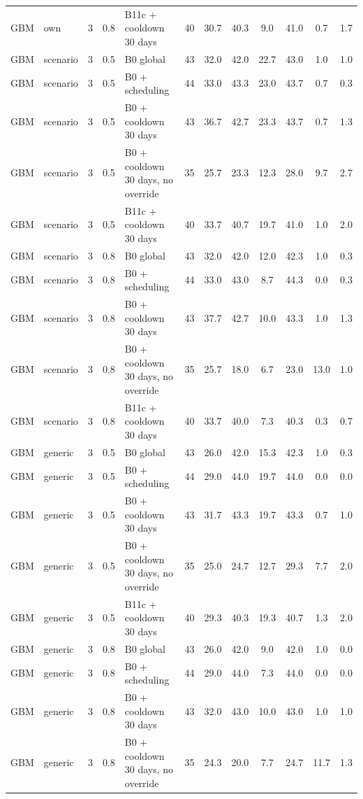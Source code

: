 \begin{longtable}{lllllccccccc}
GBM & own & 3 & 0.8 & B11c + cooldown 30 days & 40 & 30.7 & 40.3 & 9.0 & 41.0 & 0.7 & 1.7 \\
GBM & scenario & 3 & 0.5 & B0 global & 43 & 32.0 & 42.0 & 22.7 & 43.0 & 1.0 & 1.0 \\
GBM & scenario & 3 & 0.5 & B0 + scheduling & 44 & 33.0 & 43.3 & 23.0 & 43.7 & 0.7 & 0.3 \\
GBM & scenario & 3 & 0.5 & B0 + cooldown 30 days & 43 & 36.7 & 42.7 & 23.3 & 43.7 & 0.7 & 1.3 \\
GBM & scenario & 3 & 0.5 & B0 + cooldown 30 days, no override & 35 & 25.7 & 23.3 & 12.3 & 28.0 & 9.7 & 2.7 \\
GBM & scenario & 3 & 0.5 & B11c + cooldown 30 days & 40 & 33.7 & 40.7 & 19.7 & 41.0 & 1.0 & 2.0 \\
GBM & scenario & 3 & 0.8 & B0 global & 43 & 32.0 & 42.0 & 12.0 & 42.3 & 1.0 & 0.3 \\
GBM & scenario & 3 & 0.8 & B0 + scheduling & 44 & 33.0 & 43.0 & 8.7 & 44.3 & 0.0 & 0.3 \\
GBM & scenario & 3 & 0.8 & B0 + cooldown 30 days & 43 & 37.7 & 42.7 & 10.0 & 43.3 & 1.0 & 1.3 \\
GBM & scenario & 3 & 0.8 & B0 + cooldown 30 days, no override & 35 & 25.7 & 18.0 & 6.7 & 23.0 & 13.0 & 1.0 \\
GBM & scenario & 3 & 0.8 & B11c + cooldown 30 days & 40 & 33.7 & 40.0 & 7.3 & 40.3 & 0.3 & 0.7 \\
GBM & generic & 3 & 0.5 & B0 global & 43 & 26.0 & 42.0 & 15.3 & 42.3 & 1.0 & 0.3 \\
GBM & generic & 3 & 0.5 & B0 + scheduling & 44 & 29.0 & 44.0 & 19.7 & 44.0 & 0.0 & 0.0 \\
GBM & generic & 3 & 0.5 & B0 + cooldown 30 days & 43 & 31.7 & 43.3 & 19.7 & 43.3 & 0.7 & 1.0 \\
GBM & generic & 3 & 0.5 & B0 + cooldown 30 days, no override & 35 & 25.0 & 24.7 & 12.7 & 29.3 & 7.7 & 2.0 \\
GBM & generic & 3 & 0.5 & B11c + cooldown 30 days & 40 & 29.3 & 40.3 & 19.3 & 40.7 & 1.3 & 2.0 \\
GBM & generic & 3 & 0.8 & B0 global & 43 & 26.0 & 42.0 & 9.0 & 42.0 & 1.0 & 0.0 \\
GBM & generic & 3 & 0.8 & B0 + scheduling & 44 & 29.0 & 44.0 & 7.3 & 44.0 & 0.0 & 0.0 \\
GBM & generic & 3 & 0.8 & B0 + cooldown 30 days & 43 & 32.0 & 43.0 & 10.0 & 43.0 & 1.0 & 1.0 \\
GBM & generic & 3 & 0.8 & B0 + cooldown 30 days, no override & 35 & 24.3 & 20.0 & 7.7 & 24.7 & 11.7 & 1.3 \\

\end{longtable}

